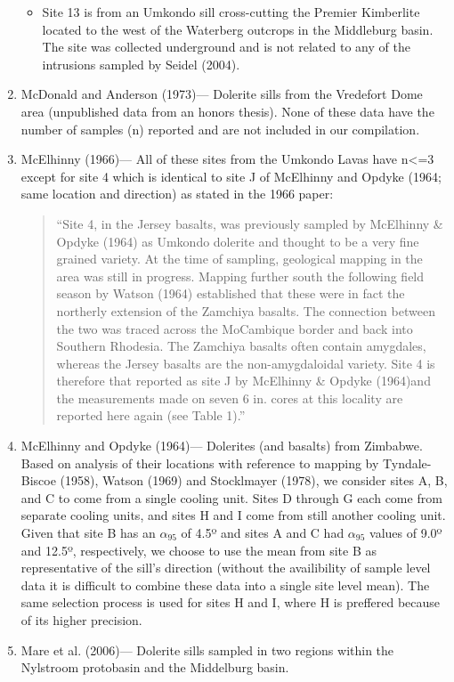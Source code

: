\documentclass{article}
\begin{document}
\begin{enumerate}
\begin{itemize}
  \item
    Site 13 is from an Umkondo sill cross-cutting the Premier Kimberlite
    located to the west of the Waterberg outcrops in the Middleburg
    basin. The site was collected underground and is not related to any
    of the intrusions sampled by Seidel (2004).
  \end{itemize}
\item
  McDonald and Anderson (1973)--- Dolerite sills from the Vredefort Dome
  area (unpublished data from an honors thesis). None of these data have
  the number of samples (n) reported and are not included in our
  compilation.
\item
  McElhinny (1966)--- All of these sites from the Umkondo Lavas have
  n\textless{}=3 except for site 4 which is identical to site J of
  McElhinny and Opdyke (1964; same location and direction) as stated in
  the 1966 paper:

  \begin{quote}
  ``Site 4, in the Jersey basalts, was previously sampled by McElhinny
  \& Opdyke (1964) as Umkondo dolerite and thought to be a very fine
  grained variety. At the time of sampling, geological mapping in the
  area was still in progress. Mapping further south the following field
  season by Watson (1964) established that these were in fact the
  northerly extension of the Zamchiya basalts. The connection between
  the two was traced across the MoCambique border and back into Southern
  Rhodesia. The Zamchiya basalts often contain amygdales, whereas the
  Jersey basalts are the non-amygdaloidal variety. Site 4 is therefore
  that reported as site J by McElhinny \& Opdyke (1964)and the
  measurements made on seven 6 in. cores at this locality are reported
  here again (see Table 1).''
  \end{quote}
\item
  McElhinny and Opdyke (1964)--- Dolerites (and basalts) from Zimbabwe.
  Based on analysis of their locations with reference to mapping by
  Tyndale-Biscoe (1958), Watson (1969) and Stocklmayer (1978), we
  consider sites A, B, and C to come from a single cooling unit. Sites D
  through G each come from separate cooling units, and sites H and I
  come from still another cooling unit. Given that site B has an
  \(\alpha_{95}\) of 4.5º and sites A and C had \(\alpha_{95}\) values
  of 9.0º and 12.5º, respectively, we choose to use the mean from site B
  as representative of the sill's direction (without the availibility of
  sample level data it is difficult to combine these data into a single
  site level mean). The same selection process is used for sites H and
  I, where H is preffered because of its higher precision.
\item
  Mare et al. (2006)--- Dolerite sills sampled in two regions within the
  Nylstroom protobasin and the Middelburg basin.


\end{enumerate}
\end{document}
